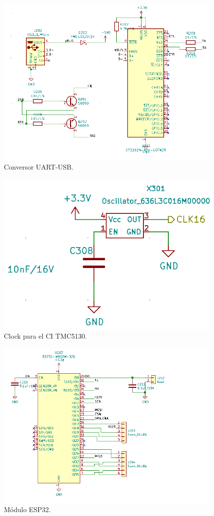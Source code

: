 \begin{figure}[htbp]
	\centering
	\includegraphics[width=.8\textwidth]{./Figures/kicad_conversor.png}
	\caption{Conversor UART-USB.}
	\label{fig:kicad_conversor}
\end{figure}

\begin{figure}[htbp]
	\centering
	\includegraphics[width=.5\textwidth]{./Figures/kicad_clock.png}
	\caption{Clock para el CI TMC5130.}
	\label{fig:kicad_clock}
\end{figure}

\begin{figure}[htbp]
	\centering
	\includegraphics[width=.6\textwidth]{./Figures/kicad_esp.png}
	\caption{Módulo ESP32.}
	\label{fig:kicad_esp}
\end{figure}

